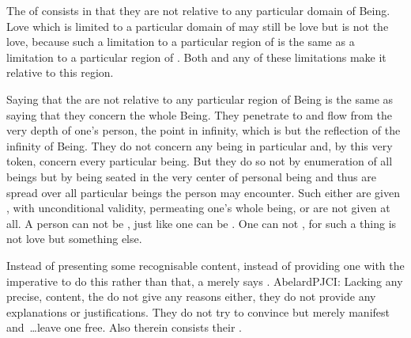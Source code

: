 
\pa The  of  consists in that they are
not relative to any particular domain of Being.  Love which is limited
to a particular domain of  may still be love but is not
the  love, because such a limitation to a particular
region of  is the same as a limitation to a particular
region of . Both and any of these limitations make it
relative to this region. 

Saying that the  are not relative to any particular region
of Being is the same as saying that they concern the whole Being.  They
penetrate to and flow from the very depth of one's person, the point in infinity,
which is but the reflection of the infinity of Being. They do not concern any
being in particular and, by this very token, concern every particular being. But
they do so not by enumeration of all beings but by being seated in the very
center of personal being and thus are spread over all particular beings the person
may encounter.  Such  either are given , with unconditional
validity, permeating one's whole being, or are not given at all.  A person can
not be , just like one can be . One
can not , for such a thing is not love but
something else.


\pa Instead of presenting some recognisable content, instead of providing one
with the imperative to do this rather than that, a  merely says
. \citet{For commandments from the Lord should not be
  expected in matters that have an obvious usefulness.}{AbelardPJC}{I:}
Lacking any precise,  content, the  do not give any
reasons either, they do not provide any explanations or justifications.  They do
not try to convince but merely {manifest} and~\ldots leave one free.  Also
therein consists their .

